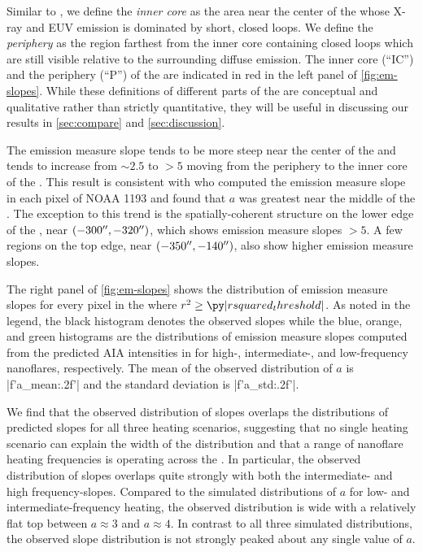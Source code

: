Similar to \citet{barnes_understanding_2019}, we define the \textit{inner core} as the area near the center of the \AR{} whose X-ray and EUV emission is dominated by short, closed loops.
We define the \textit{periphery} as the region farthest from the inner core containing closed loops which are still visible relative to the surrounding diffuse emission.
The inner core (``IC'') and the periphery (``P'') of the \AR{} are indicated in red in the left panel of \autoref{fig:em-slopes}.
While these definitions of different parts of the \AR{} are conceptual and qualitative rather than strictly quantitative, they will be useful in discussing our results in \autoref{sec:compare} and \autoref{sec:discussion}.

The emission measure slope tends to be more steep near the center of the \AR{} and tends to increase from $\sim2.5$ to $>5$ moving from the periphery to the inner core of the \AR{}.
This result is consistent with \citet{del_zanna_evolution_2015} who computed the emission measure slope in each pixel of \AR{} NOAA 1193 and found that $a$ was greatest near the middle of the \AR{}.
The exception to this trend is the spatially-coherent structure on the lower edge of the \AR{}, near $(-300\mbox{$^{\prime\prime}$},-320\mbox{$^{\prime\prime}$})$, which shows emission measure slopes $>5$.
A few regions on the top edge, near $(-350\mbox{$^{\prime\prime}$},-140\mbox{$^{\prime\prime}$})$, also show higher emission measure slopes.

The right panel of \autoref{fig:em-slopes} shows the distribution of emission measure slopes for every pixel in the \AR{} where $r^2\ge\py|rsquared_threshold|$.
As noted in the legend, the black histogram denotes the observed slopes while the blue, orange, and green histograms are the distributions of emission measure slopes computed from the predicted AIA intensities in  for high-, intermediate-, and low-frequency nanoflares, respectively.
The mean of the observed distribution of $a$ is \py[manager_em]|f'{a_mean:.2f}'| and the standard deviation is \py[manager_em]|f'{a_std:.2f}'|. 

We find that the observed distribution of slopes overlaps the distributions of predicted slopes for all three heating scenarios, suggesting that no single heating scenario can explain the width of the distribution and that a range of nanoflare heating frequencies is operating across the \AR.
In particular, the observed distribution of slopes overlaps quite strongly with both the intermediate- and high frequency-slopes.
Compared to the simulated distributions of $a$ for low- and intermediate-frequency heating, the observed distribution is wide with a relatively flat top between $a\approx3$ and $a\approx4$.
In contrast to all three simulated distributions, the observed slope distribution is not strongly peaked about any single value of $a$.

